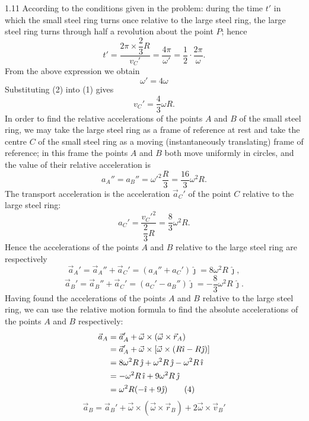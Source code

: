\begin{solution}{1.11}
According to the conditions given in the problem: during the time $t'$ in which the small steel ring turns once relative to the large steel ring, the large steel ring turns through half a revolution about the point $P$; hence
\[
t'=\frac{2\pi\times\dfrac{2}{3}R}{v_C'}=\frac{4\pi}{\omega'}=\frac{1}{2}\cdot\frac{2\pi}{\omega}.
\]
From the above expression we obtain
\begin{equation}
\omega'=4\omega \tag{2}
\end{equation}
Substituting (2) into (1) gives
\begin{equation}
v_C'=\frac{4}{3}\omega R. \tag{3}
\end{equation}
In order to find the relative accelerations of the points $A$ and $B$ of the small steel ring, we may take the large steel ring as a frame of reference at rest and take the centre $C$ of the small steel ring as a moving (instantaneously translating) frame of reference; in this frame the points $A$ and $B$ both move uniformly in circles, and the value of their relative acceleration is
\[
a_A''=a_B''=\omega'^2\frac{R}{3}=\frac{16}{3}\omega^2R.
\]
The transport acceleration is the acceleration $\vec{a}_C'$ of the point $C$ relative to the large steel ring:
\[
a_C'=\frac{v_C'^2}{\dfrac{2}{3}R}=\frac{8}{3}\omega^2R.
\]
Hence the accelerations of the points $A$ and $B$ relative to the large steel ring are respectively
\[
\vec{a}_A'=\vec{a}_A''+\vec{a}_C'=(a_A''+a_C')\hat{\jmath}=8\omega^2R\,\hat{\jmath},
\]
\[
\vec{a}_B'=\vec{a}_B''+\vec{a}_C'=(a_C'-a_B'')\hat{\jmath}=-\frac{8}{3}\omega^2R\,\hat{\jmath}.
\]
Having found the accelerations of the points $A$ and $B$ relative to the large steel ring, we can use the relative motion formula to find the absolute accelerations of the points $A$ and $B$ respectively:
\begin{align}
\vec{a}_A&=\vec{a}_A'+\vec{\omega}\times(\vec{\omega}\times\vec{r}_A)\notag\\
&=\vec{a}_A'+\vec{\omega}\times[\vec{\omega}\times(R\hat{\imath}-R\hat{\jmath})]\notag\\
&=8\omega^2R\,\hat{\jmath}+\omega^2R\,\hat{\jmath}-\omega^2R\,\hat{\imath}\notag\\
&=-\omega^2R\,\hat{\imath}+9\omega^2R\,\hat{\jmath}\notag\\
&=\omega^2R(-\hat{\imath}+9\hat{\jmath}) \tag{4}
\end{align}
\begin{equation}
\vec{a}_B=\vec{a}_B'+\vec{\omega}\times(\vec{\omega}\times\vec{r}_B)+2\vec{\omega}\times\vec{v}_B' \tag{5}
\end{equation}

\end{solution}

